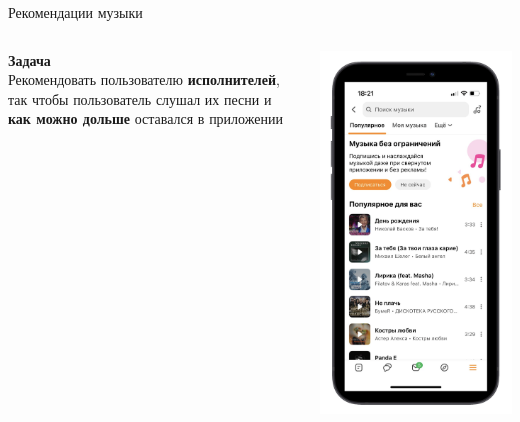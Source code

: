 \documentclass[11pt,aspectratio=169]{beamer}
\begin{document}
\begin{frame}{Рекомендации музыки}

\begin{columns}
\begin{column}{0.55\textwidth}
   {\bf Задача} \\
   Рекомендовать пользователю {\bf исполнителей}, так чтобы пользователь слушал их песни и {\bf как можно дольше} оставался в приложении
\end{column}
\begin{column}{0.3\textwidth}
    \includegraphics[scale=0.25]{images/music-screen.png}
\end{column}
\end{columns}

\end{frame}
\end{document}
